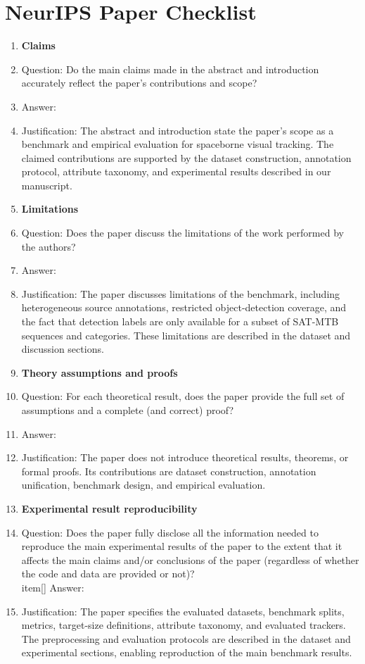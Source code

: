 \section*{NeurIPS Paper Checklist}


\begin{enumerate}

\item {\bf Claims}
    \item[] Question: Do the main claims made in the abstract and introduction accurately reflect the paper's contributions and scope?
   
    \item[] Answer: \answerYes{}
    \item[] Justification: The abstract and introduction state the paper's scope as a benchmark and empirical evaluation for spaceborne visual tracking. The claimed contributions are supported by the dataset construction, annotation protocol, attribute taxonomy, and experimental results described in our manuscript.

\item {\bf Limitations}
    \item[] Question: Does the paper discuss the limitations of the work performed by the authors?
    \item[] Answer: \answerYes{}
    \item[] Justification: The paper discusses limitations of the benchmark, including heterogeneous source annotations, restricted object-detection coverage, and the fact that detection labels are only available for a subset of SAT-MTB sequences and categories. These limitations are described in the dataset and discussion sections.


\item {\bf Theory assumptions and proofs}
    \item[] Question: For each theoretical result, does the paper provide the full set of assumptions and a complete (and correct) proof?
    \item[] Answer: \answerNA{}
    \item[] Justification: The paper does not introduce theoretical results, theorems, or formal proofs. Its contributions are dataset construction, annotation unification, benchmark design, and empirical evaluation.


    \item {\bf Experimental result reproducibility}
    \item[] Question: Does the paper fully disclose all the information needed to reproduce the main experimental results of the paper to the extent that it affects the main claims and/or conclusions of the paper (regardless of whether the code and data are provided or not)?
    \\item[] Answer: \answerYes{}
    \item[] Justification: The paper specifies the evaluated datasets, benchmark splits, metrics, target-size definitions, attribute taxonomy, and evaluated trackers. The preprocessing and evaluation protocols are described in the dataset and experimental sections, enabling reproduction of the main benchmark results.




\end{enumerate}
